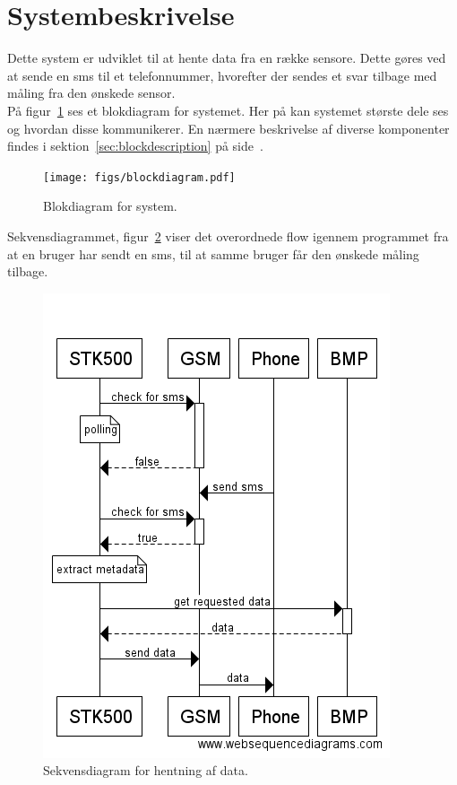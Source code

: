 \section{Systembeskrivelse}
	
Dette system er udviklet til at hente data fra en række sensore. Dette gøres ved at sende en sms til et telefonnummer, hvorefter der sendes et svar tilbage med måling fra den ønskede sensor.\\

På figur~\ref{fig:blockdiagram} ses et blokdiagram for systemet. Her på kan systemet største dele ses og hvordan disse kommunikerer. En nærmere beskrivelse af diverse komponenter findes i sektion~\ref{sec:blockdescription} på side~\pageref{sec:blockdescription}.

\vskip 0.5cm
\begin{figure}[h]
	\centering
	\texttt{[image: figs/blockdiagram.pdf]}
	\caption{Blokdiagram for system.}
	\label{fig:blockdiagram}
\end{figure}
\vskip 0.5cm

Sekvensdiagrammet, figur~\ref{fig:seq-getdata} viser det overordnede flow igennem programmet fra at en bruger har sendt en sms, til at samme bruger får den ønskede måling tilbage.

\begin{figure}[h]
	\centering
	\includegraphics[width=0.56\linewidth]{figs/seq-getdata.png}
	\caption{Sekvensdiagram for hentning af data.}
	\label{fig:seq-getdata}
\end{figure}
